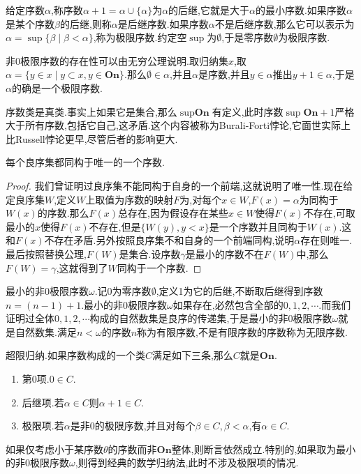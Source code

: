 给定序数$\alpha$,称序数$\alpha+1=\alpha\cup\{\alpha\}$为$\alpha$的后继,它就是大于$\alpha$的最小序数.如果序数$\alpha$是某个序数$\beta$的后继,则称$\alpha$是后继序数.如果序数$\alpha$不是后继序数,那么它可以表示为$\alpha=\sup\{\beta\mid\beta<\alpha\}$,称为极限序数.约定空$\sup$为$\emptyset$,于是零序数$\emptyset$为极限序数.

非0极限序数的存在性可以由无穷公理说明.取归纳集$x$,取$\alpha=\{y\in x\mid y\subset x,y\in\textbf{On}\}$.那么$\emptyset\in\alpha$,并且$\alpha$是序数,并且$y\in\alpha$推出$y+1\in\alpha$,于是$\alpha$的确是一个极限序数.

序数类是真类.事实上如果它是集合,那么$\sup\textbf{On}$有定义,此时序数$\sup\textbf{On}+1$严格大于所有序数,包括它自己,这矛盾.这个内容被称为Burali-Forti悖论,它面世实际上比Russell悖论更早,尽管后者的影响更大.

每个良序集都同构于唯一的一个序数.
\begin{proof}
	
	我们曾证明过良序集不能同构于自身的一个前端,这就说明了唯一性.现在给定良序集$W$,定义$W$上取值为序数的映射$F$为,对每个$x\in W$,$F(x)=\alpha$为同构于$W(x)$的序数.那么$F(x)$总存在,因为假设存在某些$x\in W$使得$F(x)$不存在,可取最小的$x$使得$F(x)$不存在,但是$\{W(y),y<x\}$是一个序数并且同构于$W(x)$.这和$F(x)$不存在矛盾.另外按照良序集不和自身的一个前端同构,说明$\alpha$存在则唯一.最后按照替换公理,$F(W)$是集合.设序数$\gamma$是最小的序数不在$F(W)$中,那么$F(W)=\gamma$,这就得到了$W$同构于一个序数.
\end{proof}

最小的非0极限序数$\omega$.记0为零序数$\emptyset$,定义1为它的后继,不断取后继得到序数$n=(n-1)+1$.最小的非0极限序数$\omega$如果存在,必然包含全部的$0,1,2,\cdots$.而我们证明过全体$0,1,2,\cdots$构成的自然数集是良序的传递集,于是最小的非0极限序数$\omega$就是自然数集.满足$n<\omega$的序数$n$称为有限序数,不是有限序数的序数称为无限序数.

超限归纳.如果序数构成的一个类$C$满足如下三条,那么$C$就是$\textbf{On}$.
\begin{enumerate}
	\item 第0项.$0\in C$.
	\item 后继项.若$\alpha\in C$则$\alpha+1\in C$.
	\item 极限项.若$\alpha$是非0的极限序数,并且对每个$\beta\in C,\beta<\alpha$,有$\alpha\in C$.
\end{enumerate}

如果仅考虑小于某序数$\theta$的序数而非$\textbf{On}$整体,则断言依然成立.特别的,如果取为最小的非0极限序数$\omega$,则得到经典的数学归纳法,此时不涉及极限项的情况.

